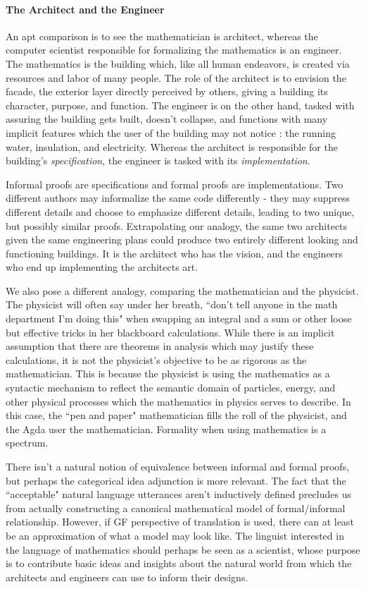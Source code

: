 \paragraph{The Architect and the Engineer}

An apt comparison is to see the mathematician is architect, whereas the computer
scientist responsible for formalizing the mathematics is an engineer. The
mathematics is the building which, like all human endeavors, is created via
resources and labor of many people. The role of the architect is to envision the
facade, the exterior layer directly perceived by others, giving a building its
character, purpose, and function. The engineer is on the other hand, tasked with
assuring the building gets built, doesn't collapse, and functions with many
implicit features which the user of the building may not notice : the running
water, insulation, and electricity. Whereas the architect is responsible for the
building's \emph{specification}, the engineer is tasked with its
\emph{implementation}.

Informal proofs are specifications and formal proofs are implementations. Two
different authors may informalize the same code differently - they may suppress
different details and choose to emphasize different details, leading to two
unique, but possibly similar proofs. Extrapolating our analogy, the same two
architects given the same engineering plans could produce two entirely different
looking and functioning buildings. It is the architect who has the vision, and
the engineers who end up implementing the architects art.

We also pose a different analogy, comparing the mathematician and the physicist.
The physicist will often say under her breath, ``don't tell anyone in the math
department I'm doing this" when swapping an integral and a sum or other loose
but effective tricks in her blackboard calculations. While there is an implicit
assumption that there are theorems in analysis which may justify these
calculations, it is not the physicist's objective to be as rigorous as the
mathematician. This is because the physicist is using the mathematics as a
syntactic mechanism to reflect the semantic domain of particles, energy, and
other physical processes which the mathematics in physics serves to describe.
In this case, the ``pen and paper" mathematician fills the roll of the
physicist, and the Agda user the mathematician. Formality when using mathematics
is a spectrum.

There isn't a natural notion of equivalence between informal and formal proofs,
but perhaps the categorical idea adjunction is more relevant. The fact that the
``acceptable" natural language utterances aren't inductively defined precludes
us from actually constructing a canonical mathematical model of formal/informal
relationship. However, if GF perspective of translation is used, there can at
least be an approximation of what a model may look like. The linguist interested
in the language of mathematics should perhaps be seen as a scientist, whose
purpose is to contribute basic ideas and insights about the natural world from
which the architects and engineers can use to inform their designs.


